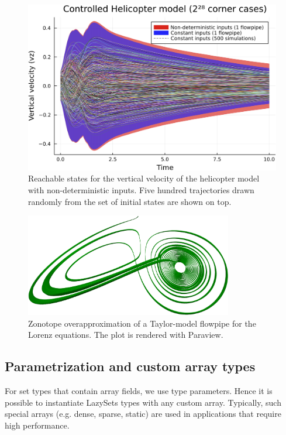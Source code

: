 \begin{figure}[tb]
	\centering
	\includegraphics[width=\linewidth,keepaspectratio]{img/heli_08_simu}
	\vspace*{.5mm}
	\caption{Reachable states for the vertical velocity of the helicopter model with non-deterministic inputs. Five hundred trajectories drawn randomly from the set of initial states are shown on top.}
	\label{fig:flowpipe_heli}
\end{figure}

\begin{figure}[tb]
	\centering
	\includegraphics[width=\linewidth,keepaspectratio,height=4.5cm]{img/lorenz}
	\vspace*{.5mm}
	\caption{Zonotope overapproximation of a Taylor-model flowpipe for the Lorenz equations. The plot is rendered with Paraview.}
	\label{fig:flowpipe_lorenz}
\end{figure}

\subsection{Parametrization and custom array types} \label{sec:custom_arrays}

For set types that contain array fields, we use type parameters. Hence it is possible to instantiate LazySets types with any custom array. Typically, such special arrays (e.g. dense, sparse, static) are used in applications that require high performance.


